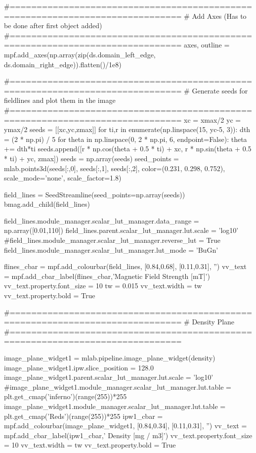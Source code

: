 \begin{pycode}[chapter3a]
#==============================================================================
# Add Axes (Has to be done after first object added)
#==============================================================================
axes, outline = mpf.add_axes(np.array(zip(ds.domain_left_edge,
ds.domain_right_edge)).flatten()/1e8)


#==============================================================================
# Generate seeds for fieldlines and plot them in the image
#==============================================================================
xc = xmax/2
yc = ymax/2
seeds = [[xc,yc,zmax]]
for ti,r in enumerate(np.linspace(15, yc-5, 3)):
    dth = (2 * np.pi) / 5
    for theta in np.linspace(0, 2 * np.pi, 6, endpoint=False):
        theta += dth*ti
        seeds.append([r * np.cos(theta + 0.5 * ti) + xc,
                      r * np.sin(theta + 0.5 * ti) + yc, zmax])
seeds = np.array(seeds)
seed_points = mlab.points3d(seeds[:,0], seeds[:,1], seeds[:,2],
color=(0.231, 0.298, 0.752), scale_mode='none',
scale_factor=1.8)


field_lines = SeedStreamline(seed_points=np.array(seeds))
bmag.add_child(field_lines)

field_lines.module_manager.scalar_lut_manager.data_range = np.array([0.01,110])
field_lines.parent.scalar_lut_manager.lut.scale = 'log10'
#field_lines.module_manager.scalar_lut_manager.reverse_lut = True
field_lines.module_manager.scalar_lut_manager.lut_mode = 'BuGn'

flines_cbar = mpf.add_colourbar(field_lines, [0.84,0.68], [0.11,0.31], '')
vv_text = mpf.add_cbar_label(flines_cbar,'Magnetic Field Strength [mT]')
vv_text.property.font_size = 10
tw = 0.015
vv_text.width = tw
vv_text.property.bold = True

#==============================================================================
# Density Plane
#==============================================================================

image_plane_widget1 = mlab.pipeline.image_plane_widget(density)
image_plane_widget1.ipw.slice_position = 128.0
image_plane_widget1.parent.scalar_lut_manager.lut.scale = 'log10'
#image_plane_widget1.module_manager.scalar_lut_manager.lut.table = plt.get_cmap('inferno')(range(255))*255
image_plane_widget1.module_manager.scalar_lut_manager.lut.table = plt.get_cmap('Reds')(range(255))*255
ipw1_cbar = mpf.add_colourbar(image_plane_widget1, [0.84,0.34], [0.11,0.31], '')
vv_text = mpf.add_cbar_label(ipw1_cbar,'     Density [mg / m3]')
vv_text.property.font_size = 10
vv_text.width = tw
vv_text.property.bold = True


\end{pycode}
